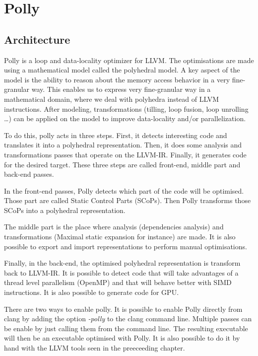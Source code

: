 \chapter{Polly}\label{ch:Polly}

\section{Architecture}
Polly is a loop and data-locality optimizer for LLVM. The optimisations are made using a mathematical model called the polyhedral model. A key aspect of the model is the ability to reason about the memory access behavior in a very fine-granular way. This enables us to express very fine-granular way in a mathematical domain, where we deal with polyhedra instead of LLVM instructions. After modeling, transformations (tilling, loop fusion, loop unrolling …) can be applied on the model to improve data-locality and/or parallelization.

To do this, polly acts in three steps. First, it detects interesting code and translates it into a polyhedral representation. Then, it does some analysis and transformations passes that operate on the LLVM-IR. Finally, it generates code for the desired target. These three steps are called front-end, middle part and back-end passes.


In the front-end passes, Polly detects which part of the code will be optimised. Those part are called Static Control Parts (SCoPs). Then Polly transforms those SCoPs into a polyhedral representation. 

The middle part is the place where analysis (dependencies analysis) and transformations (Maximal static expansion for instance) are made. It is also possible to export and import representations to perform manual optimisations.

Finally, in the back-end, the optimised polyhedral representation is transform back to LLVM-IR. It is possible to detect code that will take advantages of a thread level parallelism (OpenMP) and that will behave better with SIMD instructions. It is also possible to generate code for GPU. 

There are two ways to enable polly. It is possible to enable Polly directly from clang by adding the option \emph{-polly} to the clang command line. Multiple passes can be enable by just calling them from the command line. The resulting executable will then be an executable optimised with Polly. It is also possible to do it by hand with the LLVM tools seen in the preeceeding chapter.

